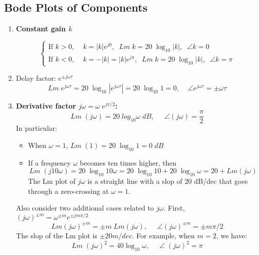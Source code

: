 \documentclass{article}
\begin{document}
\subsection*{Bode Plots of Components}

\begin{enumerate}
\item {\bf Constant gain $k$}

  \begin{equation} \left\{ \begin{array}{l}
    \mbox{If $k>0, \;\;\;\;k=|k|e^{j0}, \;\;Lm\;k=20 \;\log_{10}|k|,\;\;\angle k=0$} \\
    \mbox{If $k<0, \;\;\;\;k=-|k|=|k|e^{j\pi}, \;\;Lm\;k=20\;\log_{10}|k|,\;\;\angle k=\pi$} 
    \end{array} \right. \end{equation}

\item Delay factor: $e^{\pm j\omega \tau}$
  \begin{equation} Lm \;e^{ j\omega \tau}=20\;\log_{10} |e^{ j\omega \tau}|=20\;\log_{10} 1=0,\;\;\;\;
  \angle e^{ j\omega \tau} =\pm \omega \tau \end{equation}

\item {\bf Derivative factor $j\omega=\omega\; e^{j\pi/2}$:}
  \begin{equation} Lm\; (j\omega)=20\; log_{10} \omega\;dB,\;\;\;\;\;\angle(j\omega)=\frac{\pi}{2} \end{equation}
  In particular:
  \begin{itemize}
  \item When $\omega=1$, $Lm \;(1) =20\; \log_{10} 1=0\;dB$
  \item If a frequency $\omega$ becomes ten times higher, then
    \begin{equation} Lm\; (j10\omega)=20\; \log_{10} 10\omega=20 \;\log_{10} 10+20\;\log_{10}\omega 
    =20+Lm(j\omega) \end{equation}
    The Lm plot of $j\omega$ is a straight line with a slop of 20 dB/dec that goes
    through a zero-crossing at $\omega=1$.

  \end{itemize}

  Also consider two additional cases related to $j\omega$. First, 
  $(j\omega)^{\pm m}=\omega^{\pm m} e^{\pm j m\pi/2}$
  \begin{equation} Lm(j\omega)^{\pm m}=\pm m\;Lm(j\omega),\;\;\;\;\;\angle(j\omega)^{\pm m}=\pm m\pi/2\end{equation}
  The slop of the Lm plot is $\pm 20m/dec$. For example, when $m=2$, we have:
  \begin{equation} Lm\; (j\omega)^2=40\log_{10}\omega,\;\;\;\;\;\angle\;(j\omega)^2=\pi \end{equation}


\end{enumerate}
\end{document}
